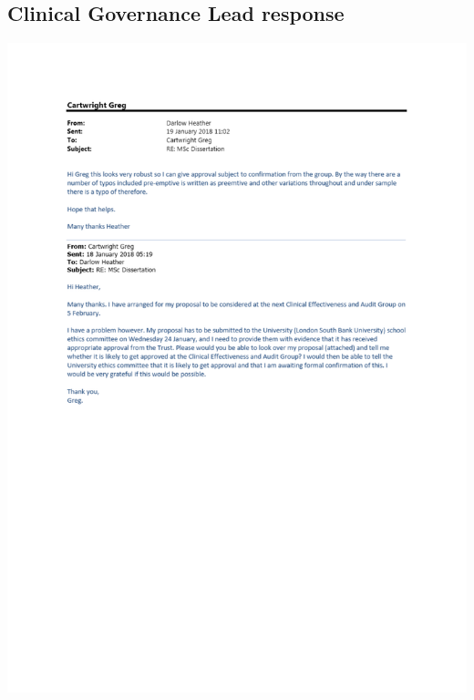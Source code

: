 \documentclass
[
	12pt,
	a4paper,
	oneside,
]{article}
\begin{document}
\begin{appendix}
\section{Clinical Governance Lead response}
\label{appendix:clingov}
\includegraphics[width=\textwidth]{heather.pdf}


\end{appendix}
\end{document}
